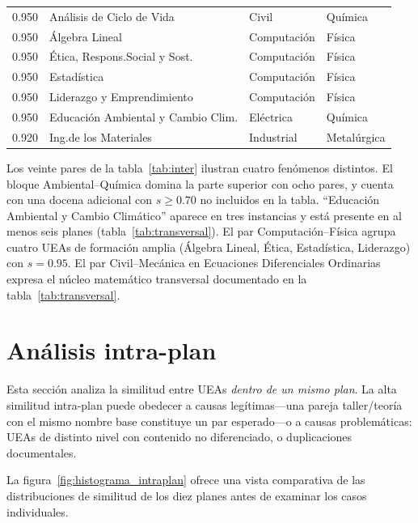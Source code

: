 \documentclass[11pt,a4paper]{article}
\begin{document}
\begin{table}[H]
\begin{tabular}{clll}
0.950 & Análisis de Ciclo de Vida           & Civil       & Química \\
0.950 & Álgebra Lineal                      & Computación & Física  \\
0.950 & Ética, Respons.\@ Social y Sost.    & Computación & Física  \\
0.950 & Estadística                         & Computación & Física  \\
0.950 & Liderazgo y Emprendimiento          & Computación & Física  \\
0.950 & Educación Ambiental y Cambio Clim.  & Eléctrica   & Química \\
0.920 & Ing.\@ de los Materiales            & Industrial  & Metalúrgica \\
\bottomrule
\end{tabular}
\end{table}

Los veinte pares de la tabla~\ref{tab:inter} ilustran cuatro fenómenos distintos.
El bloque Ambiental--Química domina la parte superior con ocho pares, y cuenta con una docena adicional con $s \geq 0.70$ no incluidos en la tabla.
``Educación Ambiental y Cambio Climático'' aparece en tres instancias y está presente en al menos seis planes (tabla~\ref{tab:transversal}).
El par Computación--Física agrupa cuatro UEAs de formación amplia (Álgebra Lineal, Ética, Estadística, Liderazgo) con $s = 0.95$.
El par Civil--Mecánica en Ecuaciones Diferenciales Ordinarias expresa el núcleo matemático transversal documentado en la tabla~\ref{tab:transversal}.

\section{Análisis intra-plan}
\label{sec:intra}

Esta sección analiza la similitud entre UEAs \textit{dentro de un mismo plan}.
La alta similitud intra-plan puede obedecer a causas legítimas---una pareja taller/teoría con el mismo nombre base constituye un par esperado---o a causas problemáticas: UEAs de distinto nivel con contenido no diferenciado, o duplicaciones documentales.

La figura~\ref{fig:histograma_intraplan} ofrece una vista comparativa de las distribuciones de similitud de los diez planes antes de examinar los casos individuales.
\end{document}
